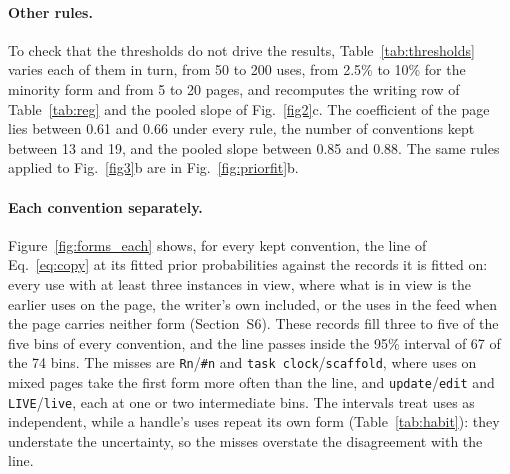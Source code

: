 \documentclass[10pt]{article}
\begin{document}
\paragraph{Other rules.} To check that the thresholds do not drive the results, Table~\ref{tab:thresholds} varies each of them in turn, from 50 to 200 uses, from 2.5\% to 10\% for the minority form and from 5 to 20 pages, and recomputes the writing row of Table~\ref{tab:reg} and the pooled slope of Fig.~\ref{fig2}c. The coefficient of the page lies between 0.61 and 0.66 under every rule, the number of conventions kept between 13 and 19, and the pooled slope between 0.85 and 0.88. The same rules applied to Fig.~\ref{fig3}b are in Fig.~\ref{fig:priorfit}b.

\begin{table}[htbp]\centering\small
\caption{\textbf{The writing results under other selection rules.} Each row keeps the conventions with at least the stated uses, minority share and pages with five or more uses; $^*$the rule of the paper. The coefficients are those of the task by three-hour specification of Table~\ref{tab:reg}, with standard errors clustered by handle, and the slope is the pooled first-use slope of Fig.~\ref{fig2}c.}\label{tab:thresholds}

\end{table}

\paragraph{Each convention separately.} Figure~\ref{fig:forms_each} shows, for every kept convention, the line of Eq.~\eqref{eq:copy} at its fitted prior probabilities against the records it is fitted on: every use with at least three instances in view, where what is in view is the earlier uses on the page, the writer's own included, or the uses in the feed when the page carries neither form (Section~S6). These records fill three to five of the five bins of every convention, and the line passes inside the 95\% interval of 67 of the 74 bins. The misses are \texttt{Rn}/\texttt{\#n} and \texttt{task clock}/\texttt{scaffold}, where uses on mixed pages take the first form more often than the line, and \texttt{update}/\texttt{edit} and \texttt{LIVE}/\texttt{live}, each at one or two intermediate bins. The intervals treat uses as independent, while a handle's uses repeat its own form (Table~\ref{tab:habit}): they understate the uncertainty, so the misses overstate the disagreement with the line.
\end{document}
